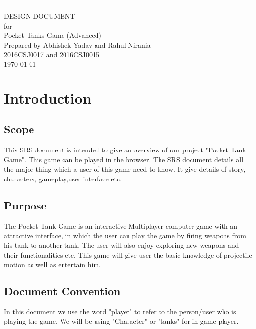 \documentclass{scrreprt}
\date{}
\begin{document}
\begin{flushright}
    \rule{16cm}{5pt}\vskip1cm
    \begin{bfseries}
        \Huge{DESIGN DOCUMENT}\\
        \vspace{1.9cm}
        for\\
        \vspace{1.9cm}
        $ $Pocket Tanks Game (Advanced)$ $\\
        \vspace{1.9cm}
        Prepared by $ $Abhishek Yadav and Rahul Nirania$ $\\
        \vspace{1.9cm}
        $ $2016CSJ0017 and 2016CSJ0015 $ $\\
        \vspace{1.9cm}
        \today\\
    \end{bfseries}
\end{flushright}

\tableofcontents

\chapter{Introduction}
\section{Scope}
$ $This SRS document is intended to give an overview of our project "Pocket Tank Game". This game can be played in the browser. The SRS document details all the major thing which a user of this game need to know. It give details of story, characters, gameplay,user interface etc. $ $
\section{Purpose}
$ $The Pocket Tank Game is an interactive Multiplayer computer game with an attractive  interface, in which the user can play the game by firing weapons from his tank to another tank. The user will also enjoy exploring new weapons and their functionalities etc. This game will give user the basic knowledge of projectile motion as well as entertain him.$ $
 \section{Document Convention}
 In this document we use the word "player" to refer to the person/user who
is playing the game. We will be using "Character" or "tanks" for in game player.
\end{document}
